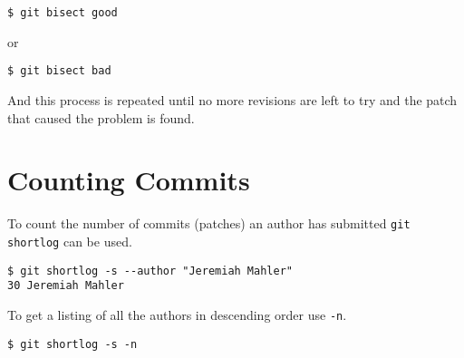 \documentclass{article}
\begin{document}
\begin{verbatim}
$ git bisect good
\end{verbatim}

or

\begin{verbatim}
$ git bisect bad
\end{verbatim}

And this process is repeated until no more revisions are left to try and
the patch that caused the problem is found.

\section{Counting Commits}

To count the number of commits (patches) an author has submitted
\verb+git shortlog+ can be used.

\begin{verbatim}
$ git shortlog -s --author "Jeremiah Mahler"
30 Jeremiah Mahler
\end{verbatim}

To get a listing of all the authors in descending order use \verb+-n+.

\begin{verbatim}
$ git shortlog -s -n
\end{verbatim}

\clearpage
\printbibliography[heading=bibintoc]
\end{document}
